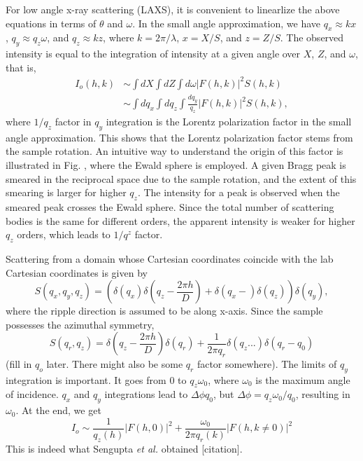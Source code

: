 \documentclass[12pt,letterpaper]{article}
\newcommand{\pars}[1]{\mathopen{}\left( #1 \right)\mathclose{}} %
\newcommand{\+}{^{\dagger}}%
\begin{document}
For low angle x-ray scattering (LAXS), it is convenient to linearlize the above
equations in terms of $\theta$ and $\omega$. In the small angle approximation, 
we have $q_x \approx kx$, $q_y \approx q_z\omega$, and $q_z \approx kz$, where
$k=2\pi/\lambda$, $x=X/S$, and $z=Z/S$. The observed intensity is equal to
the integration of intensity at a given angle over $X$, $Z$, and $\omega$, 
that is, 
\begin{align}
  I_o(h,k) &\sim \int dX \int dZ \int d\omega |F(h,k)|^2 S(h,k) \nonumber \\
           &\sim \int dq_x \int dq_z \int \frac{dq_y}{q_z} |F(h,k)|^2 S(h,k),
\end{align}
where $1/q_z$ factor in $q_y$ integration is the Lorentz polarization factor
in the small angle approximation. This shows that the Lorentz polarization 
factor stems from the sample rotation. An intuitive way to understand the
origin of this factor is illustrated in Fig. , where the Ewald sphere 
is employed. A given Bragg peak is smeared in the reciprocal space due to 
the sample rotation, and the extent of this smearing is larger for 
higher $q_z$. The intensity for a peak is observed when the smeared peak
crosses the Ewald sphere. Since the total number of scattering bodies 
is the same for different orders, the apparent intensity is weaker for
higher $q_z$ orders, which leads to $1/q^z$ factor.

Scattering from a domain whose Cartesian coordinates coincide with the lab Cartesian 
coordinates is given by
\begin{equation}
  S(q_x,q_y,q_z) = \pars{\delta(q_x)\delta\pars{q_z-\frac{2\pi h}{D}}
                   + \delta\pars{q_x-}\delta\pars{q_z}}\delta(q_y),
\end{equation}
where the ripple direction is assumed to be along x-axis. Since the sample 
possesses the azimuthal symmetry, 
\begin{equation}
  S(q_r,q_z) = \delta\pars{q_z-\frac{2\pi h}{D}}\delta(q_r)
               + \frac{1}{2\pi q_r}\delta\pars{q_z...}\delta\pars{q_r-q_0}
\end{equation} 
(fill in $q_o$ later. There might also be some $q_r$ factor somewhere). 
The limits of $q_y$ integration is important. It goes
from 0 to $q_z\omega_0$, where $\omega_0$ is the maximum angle of incidence. 
$q_x$ and $q_y$ integrations lead to $\Delta\phi q_0$, but $\Delta\phi = q_z\omega_0/q_0$,
resulting in $\omega_0$. At the end, we get
\begin{equation}
  I_o \sim \frac{1}{q_z(h)}|F(h,0)|^2+\frac{\omega_0}{2\pi q_r(k)}|F(h,k\neq 0)|^2
\end{equation}
This is indeed what Sengupta \textit{et al.} obtained [citation]. 
\end{document}
